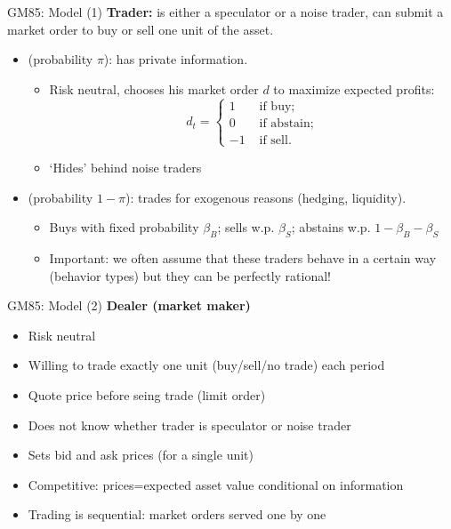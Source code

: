 \begin{frame}{GM85: Model (1)}
	\textbf{Trader:} is either a speculator or a noise trader, can submit a market order to buy or sell one unit of the asset.
	\begin{itemize}
		\item {} (probability $\pi$): has private information.
		\begin{itemize}
			\item Risk neutral, chooses his market order $d$ to maximize expected profits:
			\begin{equation*}
				d_t= \left\{
				\begin{aligned}
				1	& \text{ if buy}; \\
				0	& \text{ if abstain}; \\
				-1	& \text{ if sell}.
				\end{aligned}
				\right.
			\end{equation*}
			\item `Hides' behind noise traders
		\end{itemize}
		\item {} (probability $1-\pi$): trades for exogenous reasons (hedging, liquidity).
		\begin{itemize}
			\item Buys with fixed probability $\beta_B$; sells w.p. $\beta_S$; abstains w.p. $1-\beta_B - \beta_S$
			\item \alert{Important}: we often assume that these traders behave in a certain way (behavior types) but they can be perfectly rational!
		\end{itemize}
	\end{itemize}
\end{frame}


\begin{frame}{GM85: Model (2)}
	\textbf{Dealer (market maker)}
	\begin{itemize}
		\item Risk neutral
		\item Willing to trade \alert{exactly one unit} (buy/sell/no trade) each period
		\item Quote price before seing trade (limit order)
		\item Does not know whether trader is speculator or noise trader
		\item Sets \alert{bid and ask prices} (for a single unit)
		\item Competitive: prices=expected asset value conditional on information
		\item Trading is sequential: market orders served one by one
	\end{itemize}
\end{frame}


